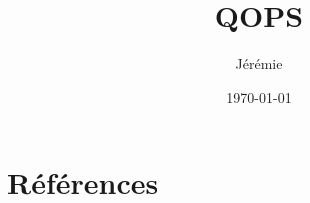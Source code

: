 \documentclass[pdftex,a4paper,11pt]{article}
\begin{document}
\title{QOPS}
\author{
	Jérémie 
}
\date{\today{}}

\maketitle


\section*{Références}




\end{document}
